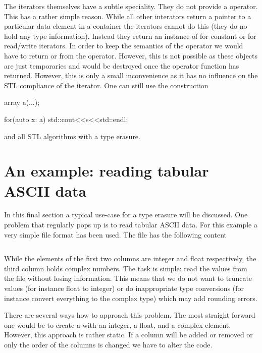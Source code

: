 The iterators themselves have a subtle speciality. They do not provide a
\cpp{->} operator. This has a rather simple reason. While all other interators
return a pointer to a particular data element in a container the 
iterators cannot do this (they do no hold any type information). Instead they
return an instance of  for constant or  for
read/write iterators. In order to keep the semantics of the \cpp{->} operator we
would have to return  or  from the \cpp{->}
operator. However, this is not possible as these objects are just temporaries
and would be destroyed once the operator function has returned. 
However, this is only a small inconvenience as it has no influence on the 
STL compliance of the iterator. 
One can still use the  construction
\begin{cppcode}
array a(...);

for(auto x: a)
    std::cout<<s<<std::endl;
\end{cppcode}
and all STL algorithms with a  type erasure.


\section{An example: reading tabular ASCII data}

In this final section a typical use-case for a type erasure will be discussed. 
One problem that regularly pops up is to read tabular ASCII data. 
For this example a very simple file format has been used. The file
has the following content
\inputminted[fontsize=\small,
             frame=lines,
             label=examples/record.dat]
{text}{../examples/record.dat}
While the elements of the first two columns are integer and float respectively,
the third column holds complex numbers. The task is simple: read the values from
the file without losing information. This means that we do not want to truncate
values (for instance float to integer) or do inappropriate type conversions (for
instance convert everything to the complex type) which may add rounding errors. 

There are several ways how to approach this problem. The most straight forward
one would be to create a  with an integer, a float, and a complex
element. However, this approach is rather static. If a column will be added or
removed or only the order of the columns is changed we have to alter the code. 

